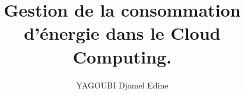 \documentclass{book}
\title{Gestion de la consommation d'\'energie dans le Cloud Computing.}
\author{YAGOUBI Djamel Edine}
\begin{document}
    \makeflyleaf
\end{document}
